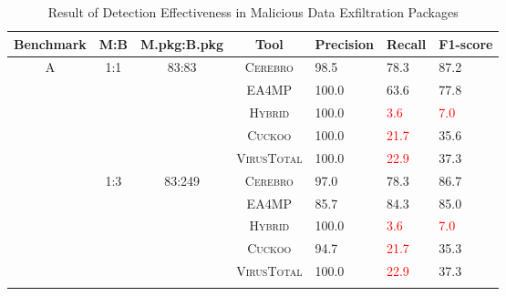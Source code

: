 \begin{table}[!t]
\centering
\footnotesize
\caption{Result of Detection Effectiveness in Malicious Data Exfiltration Packages}\label{Detection_Result}
\begin{tabular}{|c|c|c|c|l|l|l|}
\hline
Benchmark           & M:B                   & M.pkg:B.pkg             & Tool       & Precision  & Recall  & F1-score  \\ \hline
\multirow{15}{*}{A} & \multirow{5}{*}{1:1}  & \multirow{5}{*}{83:83}  & \textsc{Cerebro}    & 98.5      & 78.3    & \textcolor{green!80!black}{87.2}       \\ \cline{4-7} 
                    &                       &                         & \textsc{EA4MP}      & 100.0         & 63.6   & 77.8       \\ \cline{4-7} 
                    &                       &                         & \textsc{Hybrid}     & 100.0        & \textcolor{red}{3.6}      & \textcolor{red}{7.0}       \\ \cline{4-7} 
                    &                       &                         & \textsc{Cuckoo}     & 100.0        & \textcolor{red}{21.7}      & 35.6       \\ \cline{4-7} 
                    &                       &                         & \textsc{VirusTotal} & 100.0        & \textcolor{red}{22.9}      & 37.3       \\ \cline{2-7} 
                   
    
                    & \multirow{5}{*}{1:3}  & \multirow{5}{*}{83:249} & \textsc{Cerebro}    & 97.0        & 78.3                        & \textcolor{green!80!black}{86.7}       \\ \cline{4-7} 
                    &                       &                         & \textsc{EA4MP}      & 85.7        & 84.3                         & 85.0       \\ \cline{4-7} 
                    &                       &                         & \textsc{Hybrid}     & 100.0       & \textcolor{red}{3.6}      & \textcolor{red}{7.0}       \\ \cline{4-7} 
                    &                       &                         & \textsc{Cuckoo}     & 94.7        & \textcolor{red}{21.7}      & 35.3       \\ \cline{4-7} 
                    &                       &                         & \textsc{VirusTotal} & 100.0       & \textcolor{red}{22.9}      & 37.3       \\ \cline{2-7} 
                    

\end{tabular}
\end{table}
